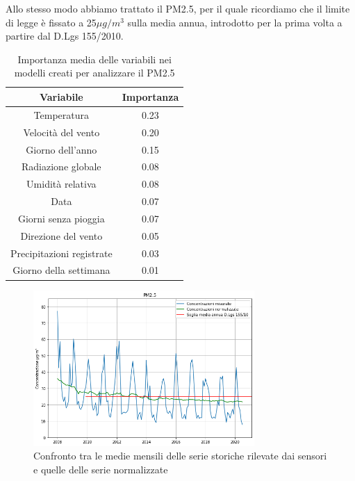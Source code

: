\documentclass[a4paper]{report}
\begin{document}

Allo stesso modo abbiamo trattato il PM2.5, per il quale ricordiamo che il limite di legge è fissato a 25$\mu g/m^3$ sulla media annua, introdotto per la prima volta a partire dal D.Lgs 155/2010.

\begin{table}[h!]
\centering
\begin{tabular}{ |c c| }
	\hline
	Variabile & Importanza \\
	\hline
	Temperatura & 0.23 \\
	Velocità del vento & 0.20 \\
	Giorno dell'anno & 0.15 \\
	Radiazione globale & 0.08 \\
	Umidità relativa & 0.08 \\
	Data & 0.07 \\
	Giorni senza pioggia & 0.07 \\
	Direzione del vento & 0.05 \\
	Precipitazioni registrate & 0.03 \\
	Giorno della settimana & 0.01 \\
	\hline
\end{tabular}
\caption{Importanza media delle variabili nei modelli creati per analizzare il PM2.5}
\label{table:importanza_pm25}
\end{table}

\begin{figure}[h]
\centering
\includegraphics[width=0.75\textwidth]{pm25_medie_mensili}
\caption{Confronto tra le medie mensili delle serie storiche rilevate dai sensori e quelle delle serie normalizzate}
\label{fig:pm25_medie_mensili}
\end{figure}
\end{document}
